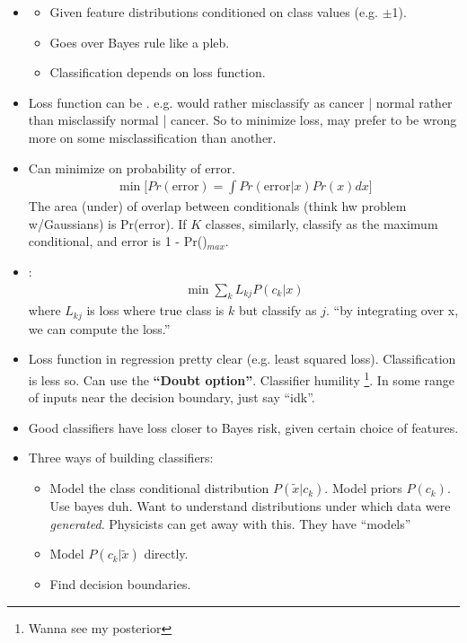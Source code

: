 \documentclass[12pt]{article}
\begin{document}
\begin{itemize}
	\item {}
	\begin{itemize}
		\item Given feature distributions conditioned on class values (e.g. $\pm$1).
		\item Goes over Bayes rule like a pleb.
		\item Classification depends on loss function.
	\end{itemize}

	\item Loss function can be . e.g. would rather misclassify as cancer | normal rather than misclassify normal | cancer. So to minimize  loss, may prefer to be wrong more on some misclassification than another.

	\item Can minimize on probability of error.
	\begin{align}
	\min \bigg[  Pr(\text{error}) = \int Pr(\text{error} | x) Pr(x) dx \bigg]
	\end{align}
	The area (under) of overlap between conditionals (think hw problem w/Gaussians) is Pr(error). If $K$ classes, similarly, classify as the maximum conditional, and error is 1 - Pr()$_{max}$.

	\item {}:
	\begin{align}
		\min \sum_k L_{kj} P(c_k |x)
	\end{align}
	where $L_{kj}$ is loss where true class is $k$ but classify as $j$. ``by integrating over x, we can compute the  loss.''

	\item Loss function in regression pretty clear (e.g. least squared loss). Classification is less so. Can use the \textbf{``Doubt option''}. Classifier humility \footnote{Wanna see my posterior}. In some range of inputs near the decision boundary, just say ``idk''.

	\item Good classifiers have  loss closer to Bayes risk, given certain choice of features.

	\item Three ways of building classifiers:
	\begin{itemize}
		\item {} Model the class conditional distribution $P(\widetilde{x} | c_k)$. Model priors $P(c_k)$. Use bayes duh. Want to understand distributions under which data were \textit{generated}. Physicists can get away with this. They have ``models'' 
		\item {} Model $P(c_k | \widetilde{x})$ directly.
		\item Find decision boundaries.
	\end{itemize}


\end{itemize}
\end{document}
